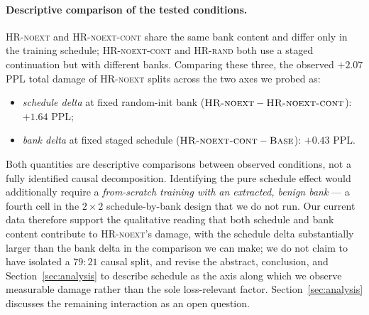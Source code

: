 \paragraph{Descriptive comparison of the tested conditions.} \textsc{HR-noext} and \textsc{HR-noext-cont} share the same bank content and differ only in the training schedule; \textsc{HR-noext-cont} and \textsc{HR-rand} both use a staged continuation but with different banks. Comparing these three, the observed $+2.07$ PPL total damage of \textsc{HR-noext} splits across the two axes we probed as:
\begin{itemize}
    \item \emph{schedule delta} at fixed random-init bank ($\textsc{HR-noext} - \textsc{HR-noext-cont}$): $+1.64$ PPL;
    \item \emph{bank delta} at fixed staged schedule ($\textsc{HR-noext-cont} - \textsc{Base}$): $+0.43$ PPL.
\end{itemize}
Both quantities are descriptive comparisons between observed conditions, not a fully identified causal decomposition. Identifying the pure schedule effect would additionally require a \emph{from-scratch training with an extracted, benign bank} — a fourth cell in the $2 \times 2$ schedule-by-bank design that we do not run. Our current data therefore support the qualitative reading that both schedule and bank content contribute to \textsc{HR-noext}'s damage, with the schedule delta substantially larger than the bank delta in the comparison we can make; we do not claim to have isolated a $79\!:\!21$ causal split, and revise the abstract, conclusion, and Section~\ref{sec:analysis} to describe schedule as the axis along which we observe measurable damage rather than the sole loss-relevant factor. Section~\ref{sec:analysis} discusses the remaining interaction as an open question.
